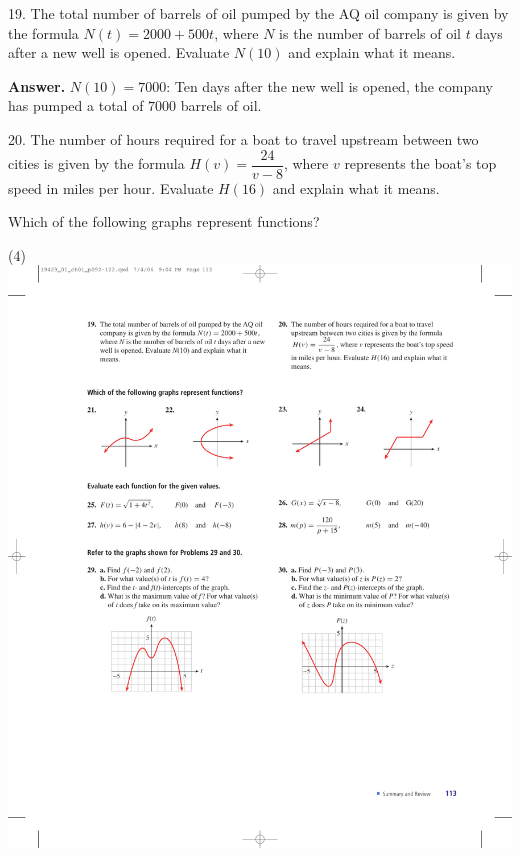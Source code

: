 \documentclass[10pt,]{book}
\theoremstyle{plain}
\theoremstyle{definition}
\theoremstyle{definition}
\theoremstyle{definition}
\theoremstyle{definition}
\numberwithin{equation}{part}
\begin{document}
\begin{exerciselist}
\item[19.]\hypertarget{exercise-415}{}The total number of barrels of oil pumped by the AQ oil company is given by the formula \(N(t) = 2000 + 500t\), where \(N\) is the number of barrels of oil \(t\) days after a new well is opened. Evaluate \(N(10)\) and explain what it means.%
\par\smallskip
\par\smallskip
\noindent\textbf{Answer.}\hypertarget{answer-231}{}\quad
\(N(10) = 7000\): Ten days after the new well is opened, the company has pumped a total of \(7000\) barrels of oil.%
\item[20.]\hypertarget{exercise-416}{}The number of hours required for a boat to travel upstream between two cities is given by the formula \(H(v) = \dfrac{24}{v - 8}\), where \(v\) represents the boat's top speed in miles per hour. Evaluate \(H(16)\) and explain what it means.%
\par\smallskip
\hypertarget{exercisegroup-54}{}\par\noindent Which of the following graphs represent functions?%
\begin{exercisegroup}(4)
\exercise[21.]\hypertarget{exercise-417}{}\includegraphics[width=0.9\linewidth]{images/fig-chap1-rev-21}

\end{exercisegroup}
\end{exerciselist}
\end{document}
